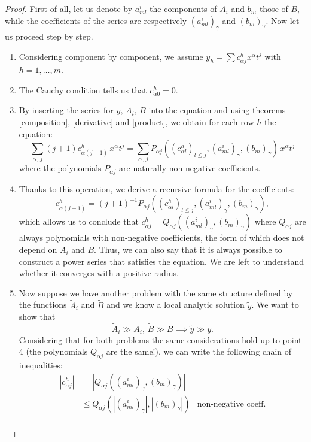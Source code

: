 \begin{proof}
First of all, let us denote by $a^i_{ml}$ the components of $A_i$ and $b_m$ those of $B$, while the coefficients of the series are respectively $(a^i_{ml})_\gamma$ and $(b_m)_\gamma$. Now let us proceed step by step.
\begin{enumerate}
\item Considering component by component, we assume $y_h = \sum c^h_{\alpha j} x^\alpha t^j$ with ${h=1,\ldots, m}$.
\item The Cauchy condition tells us that $c^h_{\alpha 0}=0$.
\item By inserting the series for $y,\, A_i,\, B$ into the equation and using theorems \ref{composition}, \ref{derivative} and \ref{product}, we obtain for each row $h$ the equation:
$$\sum\limits_{\alpha, \, j} (j+1)c^h_{\alpha (j+1)}\, x^\alpha t^j = \sum\limits_{\alpha,\, j} P_{\alpha j}\left((c^h_{\alpha l})_{l\leq j},(a^i_{ml})_\gamma, (b_m)_\gamma\right) \, x^\alpha t^j$$
where the polynomials $P_{\alpha j}$ are naturally non-negative coefficients.
\item Thanks to this operation, we derive a recursive formula for the coefficients:
$$ c^h_{\alpha (j+1)}= (j+1)^{-1} P_{\alpha j}\left((c^h_{\alpha l})_{l\leq j},(a^i_{ml})_\gamma, (b_m)_\gamma\right),$$
which allows us to conclude that $c^h_{\alpha j} = Q_{\alpha j}\left((a^i_{ml})_\gamma, (b_m)_\gamma\right)$ where $Q_{\alpha j}$ are always polynomials with non-negative coefficients, the form of which does not depend on $A_i$ and $B$. Thus, we can also say that it is always possible to construct a power series that satisfies the equation. We are left to understand whether it converges with a positive radius.
\newpage
\item Now suppose we have another problem with the same structure defined by the functions $\widetilde{A}_i $ and $\widetilde{B}$ and we know a local analytic solution $\widetilde{y}$. We want to show that $$\widetilde{A}_i \gg A_i, \, \widetilde{B} \gg B \implies \widetilde{y} \gg y.$$
Considering that for both problems the same considerations hold up to point 4 (the polynomials $Q_{\alpha j}$ are the same!), we can write the following chain of inequalities:
\begin{align*}
\left|c^h_{\alpha j}\right| &= \left|Q_{\alpha j}\left((a^i_{ml})_\gamma, (b_m)_\gamma\right)\right|\\
&\leq Q_{\alpha j}\left(\left|(a^i_{ml})_\gamma\right|, \left|(b_m)_\gamma\right|\right) 
& \text{non-negative coeff.}\\

\end{align*}
\end{enumerate}
\end{proof}
